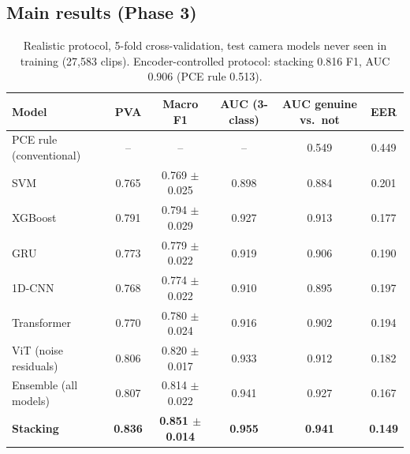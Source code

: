 \documentclass[11pt,a4paper]{article}
\begin{document}
\subsection{Main results (Phase 3)}
\begin{table}[H]\centering\small
\begin{tabular}{lccccc}\toprule
Model & PVA & Macro F1 & AUC (3-class) & AUC genuine vs.\ not & EER \\\midrule
PCE rule (conventional) & -- & -- & -- & 0.549 & 0.449 \\
SVM & 0.765 & 0.769 $\pm$ 0.025 & 0.898 & 0.884 & 0.201 \\
XGBoost & 0.791 & 0.794 $\pm$ 0.029 & 0.927 & 0.913 & 0.177 \\
GRU & 0.773 & 0.779 $\pm$ 0.022 & 0.919 & 0.906 & 0.190 \\
1D-CNN & 0.768 & 0.774 $\pm$ 0.022 & 0.910 & 0.895 & 0.197 \\
Transformer & 0.770 & 0.780 $\pm$ 0.024 & 0.916 & 0.902 & 0.194 \\
ViT (noise residuals) & 0.806 & 0.820 $\pm$ 0.017 & 0.933 & 0.912 & 0.182 \\
Ensemble (all models) & 0.807 & 0.814 $\pm$ 0.022 & 0.941 & 0.927 & 0.167 \\
\textbf{Stacking} & \textbf{0.836} & \textbf{0.851 $\pm$ 0.014} & \textbf{0.955} & \textbf{0.941} & \textbf{0.149} \\\bottomrule
\end{tabular}\caption{Realistic protocol, 5-fold cross-validation, test camera models never seen in training (27,583 clips).
Encoder-controlled protocol: stacking 0.816 F1, AUC 0.906 (PCE rule 0.513).}\label{tab:main}\end{table}
\end{document}
